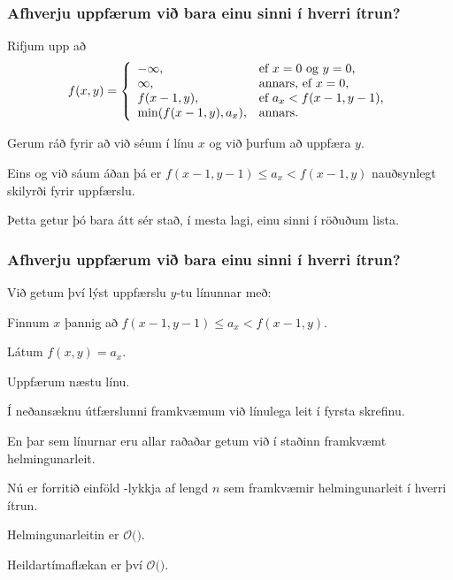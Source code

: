 {
	\frametitle{Afhverju uppfærum við bara einu sinni í hverri ítrun?}
	{
		\item<1-> Rifjum upp að
		\[
			f(x, y) = \left \{
			\env{array}
			{ {l l}
				-\infty, & \text{ef $x = 0$ og $y = 0$,} \\
				\infty, & \text{annars, ef $x = 0$,} \\
				f(x - 1, y), & \text{ef $a_x < f(x - 1, y - 1)$,} \\
				\min(f(x - 1, y), a_x), & \text{annars.}
			}
			\right .
		\]
		\item<2-> Gerum ráð fyrir að við séum í línu $x$ og við þurfum að uppfæra $y$.
		\item<3-> Eins og við sáum áðan þá er $f(x - 1, y - 1) \leq a_x < f(x - 1, y)$ nauðsynlegt skilyrði fyrir uppfærslu.
		\item<4-> Þetta getur þó bara átt sér stað, í mesta lagi, einu sinni í röðuðum lista.
	}
}

{
	\frametitle{Afhverju uppfærum við bara einu sinni í hverri ítrun?}
	{
		\item<1-> Við getum því lýst uppfærslu $y$-tu línunnar með:
		{
			\item<2-> Finnum $x$ þannig að $f(x - 1, y - 1) \leq a_x < f(x - 1, y)$.
			\item<3-> Látum $f(x, y) = a_x$.
			\item<4-> Uppfærum næstu línu.
		}
		\item<5-> Í neðansæknu útfærslunni framkvæmum við línulega leit í fyrsta skrefinu.
		\item<6-> En þar sem línurnar eru allar raðaðar getum við í staðinn framkvæmt helmingunarleit.
	}
}

{
}

{
	{
		\item<1-> Nú er forritið einföld -lykkja af lengd $n$ sem framkvæmir helmingunarleit í hverri ítrun.
		\item<2-> Helmingunarleitin er $\mathcal{O}($\onslide<3->{$\log n$}$)$.
		\item<4-> Heildartímaflækan er því $\mathcal{O}($\onslide<5->{$n \log n$}$)$.
	}
}

{
}


